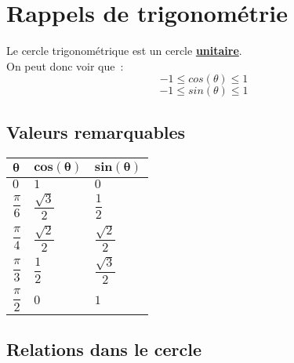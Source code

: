 \chapter{Rappels de trigonométrie}

\begin{center}

\end{center}

Le cercle trigonométrique est un cercle \textbf{\underline{unitaire}}. \\

On peut donc voir que~: \\
$$ -1 \leq cos(\theta) \leq 1 $$
$$ -1 \leq sin(\theta) \leq 1 $$

\pagebreak
\section*{Valeurs remarquables}
\begin{minipage}{0.5\textwidth}
\begin{center}

\end{center}
\end{minipage}
\begin{minipage}{0.5\textwidth}
\begin{center}
	\setlength{\tabulinesep}{2mm}
	\begin{tabu} to 80mm {|X[c]|X[c]|X[c]|}
	\hline
	$\bm{\theta}$ & $\bm{cos(\theta)}$ & $\bm{sin(\theta)}$ \\ 
	\hline
	$0$ & $1$ & $0$ \\ 
	\hline
	$\dfrac{\pi}{6}$ & $\dfrac{\sqrt{3}}{2}$ & $\dfrac{1}{2}$ \\ 
	\hline
		$\dfrac{\pi}{4}$ & $\dfrac{\sqrt{2}}{2}$ & $\dfrac{\sqrt{2}}{2}$ \\ 
	\hline
		$\dfrac{\pi}{3}$ & $\dfrac{1}{2}$ & $\dfrac{\sqrt{3}}{2}$ \\ 
	\hline
	$\dfrac{\pi}{2}$ & $0$ & $1$ \\ 
	\hline
\end{tabu}
\end{center}
\end{minipage}
\section*{Relations dans le cercle}

